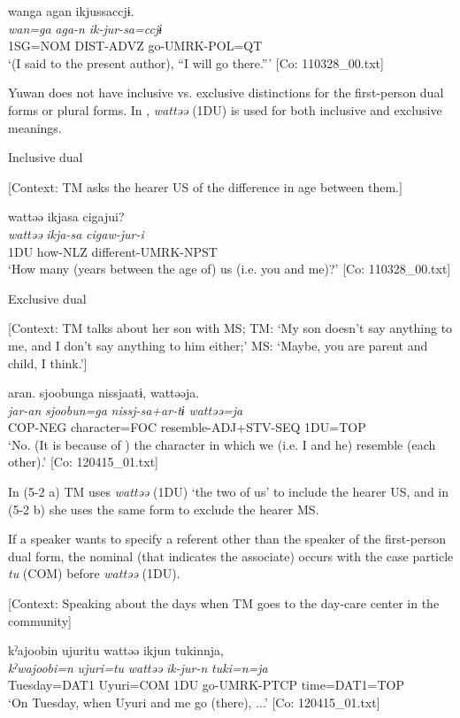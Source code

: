 \glll  wanga  agan  ikjussaccjɨ.\\
\textit{wan=ga}  \textit{aga-n}  \textit{ik-jur-sa=ccjɨ}\\
1SG=NOM  DIST-ADVZ  go-UMRK-POL=QT\\
\glt ‘(I said to the present author), “I will go there.”’ [Co: 110328\_00.txt]
\z

Yuwan does not have inclusive vs. exclusive distinctions for the first-person dual forms or plural forms. In , \textit{wattəə} (1DU) is used for both inclusive and exclusive meanings.

\ea \label{ex:5:3}  \ea \label{ex:5:3a} Inclusive dual

    [Context: TM asks the hearer US of the difference in age between them.]

\glll  wattəə  ikjasa  cigajui?\\
\textit{wattəə}  \textit{ikja-sa}  \textit{cigaw-jur-i}\\
1DU  how-NLZ  different-UMRK-NPST\\
\glt ‘How many (years between the age of) us (i.e. you and me)?’ [Co: 110328\_00.txt]

 \ex \label{ex:5:b} Exclusive dual

    [Context: TM talks about her son with MS; TM: ‘My son doesn’t say anything to me, and I don’t say anything to him either;’ MS: ‘Maybe, you are parent and child, I think.’]

\glll  aran.  sjoobunga  nissjaatɨ,  wattəəja.\\
\textit{jar-an}  \textit{sjoobun=ga}  \textit{nissj-sa+ar-tɨ}  \textit{wattəə=ja}\\
COP-NEG  character=FOC  resemble-ADJ+STV-SEQ  1DU=TOP\\
\glt ‘No. (It is because of ) the character in which we (i.e. I and he) resemble (each other).’ [Co: 120415\_01.txt]
\z
\z

In (5-2 a) TM uses \textit{wattəə} (1DU) ‘the two of us’ to include the hearer US, and in (5-2 b) she uses the same form to exclude the hearer MS.

If a speaker wants to specify a referent other than the speaker of the first-person dual form, the nominal (that indicates the associate) occurs with the case particle \textit{tu} (COM) before \textit{wattəə} (1DU).

\ea \label{ex:5:4}   [Context: Speaking about the days when TM goes to the day-care center in the community]

\glll  kˀajoobin  ujuritu  wattəə  ikjun  tukinnja,\\
\textit{kˀwajoobi}\footnotemark\textit{=n}  \textit{ujuri=tu}  \textit{wattəə}  \textit{ik-jur-n}  \textit{tuki=n=ja}\\
Tuesday=DAT1  Uyuri=COM  1DU  go-UMRK-PTCP  time=DAT1=TOP\\
\glt ‘On Tuesday, when Uyuri and me go (there), ...’ [Co: 120415\_01.txt]
\z
{}

